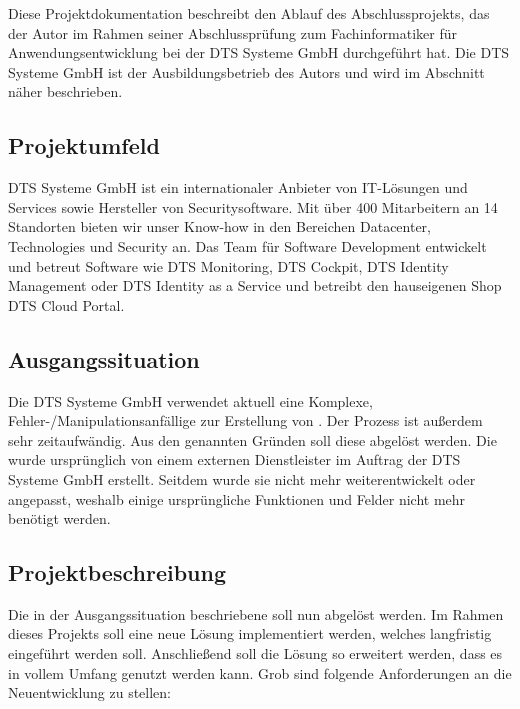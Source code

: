 Diese Projektdokumentation beschreibt den Ablauf des Abschlussprojekts, das der Autor im Rahmen seiner Abschlussprüfung zum Fachinformatiker für Anwendungsentwicklung bei der DTS Systeme GmbH durchgeführt hat. Die DTS Systeme GmbH ist der Ausbildungsbetrieb des Autors und wird im Abschnitt  näher beschrieben.

\subsection{Projektumfeld}
\label{sec:Einführung-Definitionsphase:Projektumfeld}

DTS Systeme GmbH ist ein internationaler Anbieter von IT-Lösungen und Services sowie Hersteller von Securitysoftware. Mit über 400 Mitarbeitern an 14 Standorten bieten wir unser Know-how in den Bereichen Datacenter, Technologies und Security an.
Das Team für Software Development entwickelt und betreut Software wie DTS Monitoring, DTS Cockpit, DTS Identity Management oder DTS Identity as a Service und betreibt den hauseigenen Shop DTS Cloud Portal.

\subsection{Ausgangssituation}
\label{sec:Einführung-Definitionsphase:Ausgangssituation}

Die DTS Systeme GmbH verwendet aktuell eine Komplexe, Fehler-/Manipulationsanfällige  zur Erstellung von . Der Prozess ist außerdem sehr zeitaufwändig. Aus den genannten Gründen soll diese  abgelöst werden.
Die  wurde ursprünglich von einem externen Dienstleister im Auftrag der DTS Systeme GmbH erstellt. Seitdem wurde sie nicht mehr weiterentwickelt oder angepasst, weshalb einige ursprüngliche Funktionen und Felder nicht mehr benötigt werden.

\subsection{Projektbeschreibung}
\label{sec:Einführung-Definitionsphase:Projektbeschreibung}

Die in der Ausgangssituation beschriebene  soll nun abgelöst werden.
Im Rahmen dieses Projekts soll eine neue Lösung implementiert werden, welches langfristig eingeführt werden soll. Anschließend soll die Lösung so erweitert werden, dass es in vollem Umfang genutzt werden kann.
Grob sind folgende Anforderungen an die Neuentwicklung zu stellen:

